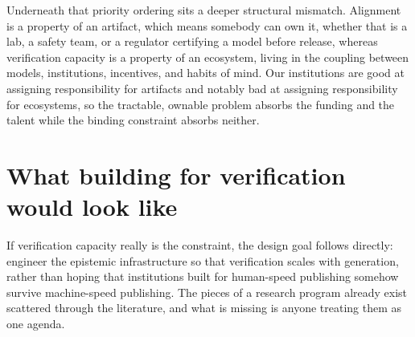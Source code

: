 \documentclass[11pt,letterpaper]{article}
\begin{document}
Underneath that priority ordering sits a deeper structural mismatch. Alignment is a property of an artifact, which means somebody can own it, whether that is a lab, a safety team, or a regulator certifying a model before release, whereas verification capacity is a property of an ecosystem, living in the coupling between models, institutions, incentives, and habits of mind. Our institutions are good at assigning responsibility for artifacts and notably bad at assigning responsibility for ecosystems, so the tractable, ownable problem absorbs the funding and the talent while the binding constraint absorbs neither.

\section{What building for verification would look like}

If verification capacity really is the constraint, the design goal follows directly: engineer the epistemic infrastructure so that verification scales with generation, rather than hoping that institutions built for human-speed publishing somehow survive machine-speed publishing. The pieces of a research program already exist scattered through the literature, and what is missing is anyone treating them as one agenda.
\end{document}
